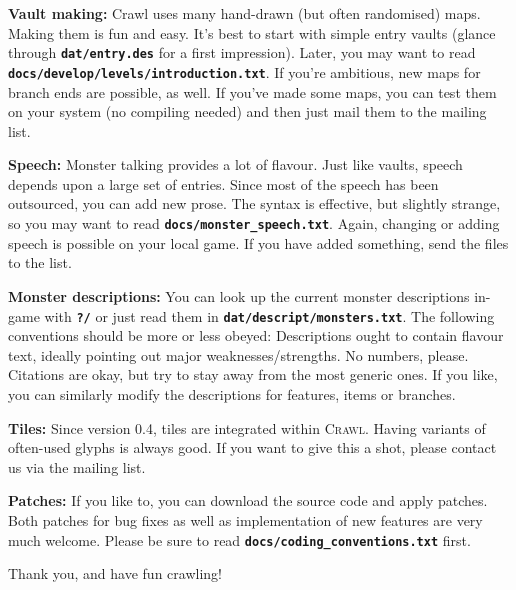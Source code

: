 \documentclass[a4paper,10pt]{article}
\newcommand{\key}[1]{{{\texttt{\textbf{#1}}}}} %
\newcommand{\crawl}{\textsc{Crawl}}
\newcommand{\para}{\vspace{1.5ex}}
\begin{document}
\para

\textbf{Vault making:}
Crawl uses many hand-drawn (but often randomised) maps. Making them is fun 
and easy. It's best to start with simple entry vaults (glance through 
\key{dat/entry.des} for a first impression). Later, you may want to read 
\key{docs/develop/levels/introduction.txt}. If you're ambitious, new 
maps for branch ends are possible, as well.
If you've made some maps, you can test them on your system (no compiling 
needed) and then just mail them to the mailing list.

\para

\textbf{Speech:}
Monster talking provides a lot of flavour. Just like vaults, speech depends 
upon a large set of entries. Since most of the speech has been outsourced, 
you can add new prose. The syntax is effective, but slightly strange, so you 
may want to read \key{docs/monster\_speech.txt}.
Again, changing or adding speech is possible on your local game. If you 
have added something, send the files to the list.

\para

\textbf{Monster descriptions:}
You can look up the current monster descriptions in-game with \key{?/} or 
just read them in \key{dat/descript/monsters.txt}. The following conventions 
should be more or less obeyed: Descriptions ought to contain flavour text, 
ideally pointing out major weaknesses/strengths. No numbers, please. 
Citations are okay, but try to stay away from the most generic ones.
If you like, you can similarly modify the descriptions for features, items or
branches.

\para

\textbf{Tiles:}
Since version 0.4, tiles are integrated within \crawl. Having variants of 
often-used glyphs is always good. If you want to give this a shot, please 
contact us via the mailing list.

\para

\textbf{Patches:}
If you like to, you can download the source code and apply patches. Both 
patches for bug fixes as well as implementation of new features are very 
much welcome. Please be sure to read \key{docs/coding\_conventions.txt} first.

\para\para\para

Thank you, and have fun crawling!
\end{document}
